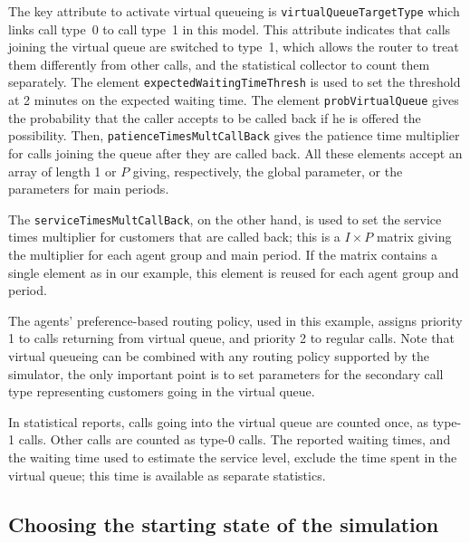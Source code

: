 The key attribute to activate virtual queueing is
\texttt{virtual\-Queue\-Target\-Type} which links call type~0 to call
type~1 in this model.
This attribute indicates that calls joining the virtual queue are
switched to type~1, which allows the router to treat them differently
from other calls, and the statistical collector to count them
separately.
The element \texttt{expected\-Waiting\-Time\-Thresh} is used to set
the threshold at 2 minutes on the expected waiting time.
The element \texttt{prob\-Virtual\-Queue} gives the probability that the caller
accepts to be called back if he is offered the possibility.
Then, \texttt{patience\-Times\-Mult\-Call\-Back} gives the patience
time multiplier for calls joining the queue after they are called
back.
All these elements accept an array of length 1 or $P$ giving,
respectively, the global parameter, or the parameters for main
periods.

The \texttt{service\-Times\-Mult\-Call\-Back}, on the other hand, is
used to set the service times multiplier for customers that are called
back; this is a $I\times P$ matrix giving the multiplier for each
agent group and main period.
If the matrix contains a single element as in our example, this
element is reused for each agent group and period.

The agents' preference-based routing policy, used in this example,
assigns priority 1 to calls returning from virtual queue, and priority
2 to regular calls.
Note that virtual queueing can be combined with any routing policy
supported by the simulator, the only important point is to set
parameters for the secondary call type representing customers going in
the virtual queue.

In statistical reports, calls going into the virtual queue are counted
once, as type-1 calls.  Other calls are counted as type-0 calls.  The
reported waiting times, and the waiting time used to estimate the
service level, exclude the time spent in the virtual queue; this time
is available as separate statistics.


\subsection{Choosing the starting state of the simulation}
\label{sec:startingState}

